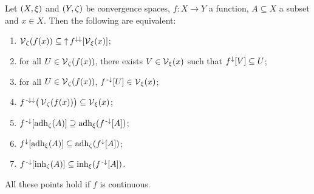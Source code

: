 \begin{proposition} \label{continuityVicinityFilter} \label{adherenceInherenceContinuity}
Let $\sSet{X,\xi}$ and $\sSet{Y,\zeta}$ be convergence spaces, $f: X\to Y$ a function, $A\subseteq X$ a subset and $x\in X$. Then the following are equivalent:
\begin{enumerate}
\item $\vicinity_\zeta(f(x)) \subseteq \upset f^{\imf\imf}[\vicinity_\xi(x)]$;
\item for all $U\in \vicinity_\zeta(f(x))$, there exists $V\in \vicinity_\xi(x)$ such that $f^\imf[V] \subseteq U$;
\item for all $U\in \vicinity_\zeta(f(x))$, $f^{\preimf}[U]\in \vicinity_\xi(x)$;
\item $f^{\preimf\imf}\big(\vicinity_\zeta(f(x))\big) \subseteq \vicinity_\xi(x)$;
\item $f^\preimf[\adh_\zeta(A)] \supseteq \adh_\xi(f^\preimf[A])$;
\item $f^\imf[\adh_\xi(A)] \subseteq \adh_\zeta(f^\imf[A])$;
\item $f^\preimf[\inh_\zeta(A)] \subseteq \inh_\xi(f^\preimf[A])$.
\end{enumerate}
All these points hold if $f$ is continuous.
\end{proposition}
